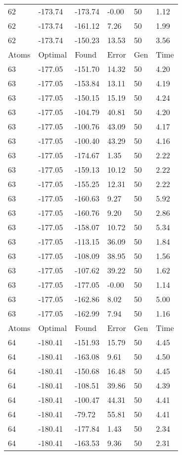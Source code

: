 \documentclass{report}
\begin{document}
\begin{appendix}
\begin{longtable}{llllll}
62 & -173.74 & -173.74 & -0.00 & 50 & 1.12 \\
62 & -173.74 & -161.12 & 7.26 & 50 & 1.99 \\
62 & -173.74 & -150.23 & 13.53 & 50 & 3.56 \\
Atoms & Optimal & Found & Error & Gen & Time \\
63 & -177.05 & -151.70 & 14.32 & 50 & 4.20 \\
63 & -177.05 & -153.84 & 13.11 & 50 & 4.19 \\
63 & -177.05 & -150.15 & 15.19 & 50 & 4.24 \\
63 & -177.05 & -104.79 & 40.81 & 50 & 4.20 \\
63 & -177.05 & -100.76 & 43.09 & 50 & 4.17 \\
63 & -177.05 & -100.40 & 43.29 & 50 & 4.16 \\
63 & -177.05 & -174.67 & 1.35 & 50 & 2.22 \\
63 & -177.05 & -159.13 & 10.12 & 50 & 2.22 \\
63 & -177.05 & -155.25 & 12.31 & 50 & 2.22 \\
63 & -177.05 & -160.63 & 9.27 & 50 & 5.92 \\
63 & -177.05 & -160.76 & 9.20 & 50 & 2.86 \\
63 & -177.05 & -158.07 & 10.72 & 50 & 5.34 \\
63 & -177.05 & -113.15 & 36.09 & 50 & 1.84 \\
63 & -177.05 & -108.09 & 38.95 & 50 & 1.56 \\
63 & -177.05 & -107.62 & 39.22 & 50 & 1.62 \\
63 & -177.05 & -177.05 & -0.00 & 50 & 1.14 \\
63 & -177.05 & -162.86 & 8.02 & 50 & 5.00 \\
63 & -177.05 & -162.99 & 7.94 & 50 & 1.16 \\
Atoms & Optimal & Found & Error & Gen & Time \\
64 & -180.41 & -151.93 & 15.79 & 50 & 4.45 \\
64 & -180.41 & -163.08 & 9.61 & 50 & 4.50 \\
64 & -180.41 & -150.68 & 16.48 & 50 & 4.45 \\
64 & -180.41 & -108.51 & 39.86 & 50 & 4.39 \\
64 & -180.41 & -100.47 & 44.31 & 50 & 4.41 \\
64 & -180.41 & -79.72 & 55.81 & 50 & 4.41 \\
64 & -180.41 & -177.84 & 1.43 & 50 & 2.34 \\
64 & -180.41 & -163.53 & 9.36 & 50 & 2.31 \\

\end{longtable}
\end{appendix}
\end{document}
